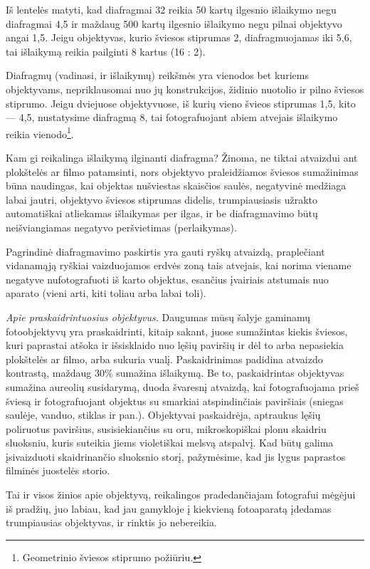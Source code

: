 \documentclass{book}
\begin{document}
					Iš lentelės matyti, kad diafragmai 32 reikia 50 kartų ilgesnio išlaikymo negu diafragmai 4,5 ir maždaug 500 kartų ilgesnio išlaikymo negu pilnai objektyvo angai 1,5. Jeigu objektyvas, kurio šviesos stiprumas 2, diafragmuojamas iki 5,6, tai išlaikymą reikia pailginti 8 kartus (16 : 2).

					Diafragmų (vadinasi, ir išlaikymų) reikšmės yra vienodos bet kuriems objektyvams, nepriklausomai nuo jų konstrukcijos, židinio nuotolio ir pilno šviesos stiprumo. Jeigu dviejuose objektyvuose, iš kurių vieno švieos stiprumas 1,5, kito --- 4,5, nustatysime diafragmą 8, tai fotografuojant abiem atvejais išlaikymo reikia vienodo\footnote{Geometrinio šviesos stiprumo požiūriu.}.

					Kam gi reikalinga išlaikymą ilginanti diafragma? Žinoma, ne tiktai atvaizdui ant plokštelės ar filmo patamsinti, nors objektyvo praleidžiamos šviesos sumažinimas būna naudingas, kai objektas nušviestas skaisčios saulės, negatyvinė medžiaga labai jautri, objektyvo šviesos stiprumas didelis, trumpiausiasis užrakto automatiškai atliekamas išlaikymas per ilgas, ir be diafragmavimo būtų neišviangiamas negatyvo peršvietimas (perlaikymas).

					Pagrindinė diafragmavimo paskirtis yra gauti ryškų atvaizdą, praplečiant vidanamąją ryškiai vaizduojamos erdvės zoną tais atvejais, kai norima viename negatyve nufotografuoti iš karto objektus, esančius įvairiais atstumais nuo aparato (vieni arti, kiti toliau arba labai toli).

					\textit{Apie praskaidrintuosius objektyvus.} Daugumas mūsų šalyje gaminamų fotoobjektyvų yra praskaidrinti, kitaip sakant, juose sumažintas kiekis šviesos, kuri paprastai atšoka ir išsisklaido nuo lęšių paviršių ir dėl to arba nepasiekia plokštelės ar filmo, arba sukuria vualį. Paskaidrinimas padidina atvaizdo kontrastą, maždaug 30\% sumažina išlaikymą. Be to, paskaidrintas objektyvas sumažina aureolių susidarymą, duoda švaresnį atvaizdą, kai fotografuojama prieš šviesą ir fotografuojant objektus su smarkiai atspindinčiais paviršiais (sniegas saulėje, vanduo, stiklas ir pan.). Objektyvai paskaidrėja, aptraukus lęšių poliruotus paviršius, susisiekiančius su oru, mikroskopiškai plonu skaidriu sluoksniu, kuris suteikia jiems violetiškai melsvą atspalvį. Kad būtų galima įsivaizduoti skaidrinančio sluoksnio storį, pažymėsime, kad jis lygus  paprastos filminės juostelės storio.

					Tai ir visos žinios apie objektyvą, reikalingos pradedančiajam fotografui mėgėjui iš pradžių, juo labiau, kad jau gamykloje į kiekvieną fotoaparatą įdedamas trumpiausias objektyvas, ir rinktis jo nebereikia.
\end{document}
